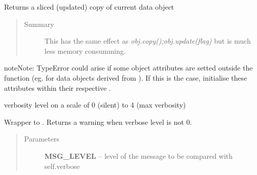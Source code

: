 \documentclass[letterpaper,10pt,english]{sphinxmanual}
\begin{document}
\begin{fulllineitems}
\begin{fulllineitems}
\begin{quote}
\begin{description}
\end{description}\end{quote}

\end{fulllineitems}


\begin{fulllineitems}
\label{altimetry.data:altimetry.data.hydro_data.updated_copy}
Returns a sliced (updated) copy of current data object
\begin{quote}\begin{description}
\item[{Summary }] \leavevmode
This has the same effect as \emph{obj.copy();obj.update(flag)} but is much less memory consumming.

\end{description}\end{quote}

\begin{notice}{note}{Note:}
TypeError could arise if some object attributes are setted outside the  function (eg. for data objects derived from ). If this is the case, initialise these attributes within their respective .
\end{notice}

\end{fulllineitems}


\begin{fulllineitems}
\label{altimetry.data:altimetry.data.hydro_data.verbose}
verbosity level on a scale of 0 (silent) to 4 (max verbosity)

\end{fulllineitems}


\begin{fulllineitems}
\label{altimetry.data:altimetry.data.hydro_data.warning}
Wrapper to . Returns a warning when verbose level is not 0.
\begin{quote}\begin{description}
\item[{Parameters}] \leavevmode
\textbf{MSG\_LEVEL} -- level of the message to be compared with self.verbose


\end{description}
\end{quote}
\end{fulllineitems}
\end{fulllineitems}
\end{document}
